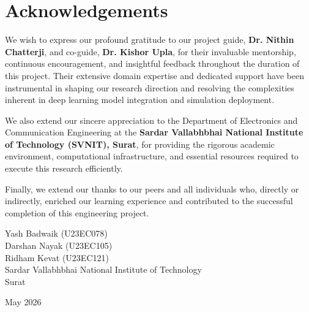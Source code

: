 \chapter*{Acknowledgements}

We wish to express our profound gratitude to our project guide, \textbf{Dr. Nithin Chatterji}, and co-guide, \textbf{Dr. Kishor Upla}, for their invaluable mentorship, continuous encouragement, and insightful feedback throughout the duration of this project. Their extensive domain expertise and dedicated support have been instrumental in shaping our research direction and resolving the complexities inherent in deep learning model integration and simulation deployment.

We also extend our sincere appreciation to the Department of Electronics and Communication Engineering at the \textbf{Sardar Vallabhbhai National Institute of Technology (SVNIT), Surat}, for providing the rigorous academic environment, computational infrastructure, and essential resources required to execute this research efficiently.

Finally, we extend our thanks to our peers and all individuals who, directly or indirectly, enriched our learning experience and contributed to the successful completion of this engineering project.

\vspace{2cm}
\begin{flushright} 
Yash Badwaik (U23EC078)\\
Darshan Nayak (U23EC105)\\
Ridham Kevat (U23EC121)\\[0.2in]
Sardar Vallabhbhai National Institute of Technology\\
Surat\\
\end{flushright}

\begin{flushleft} 
May 2026 \\
\end{flushleft}
